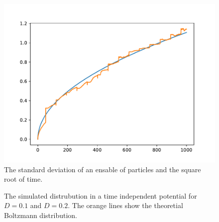 \documentclass[a4paper, 12pt]{article}
\begin{document}
\begin{figure}[ht]
\centering
\includegraphics[width=.75\textwidth]{media/diffusion}
\caption{The standard deviation of an ensable of particles and the square root of time.
\label{fig:diffusion}}
\end{figure}

\begin{figure}
\centering
{}
\caption{The simulated distrubution in a time independent potential for $D=0.1$ and $D=0.2$.
The orange lines show the theoretial Boltzmann distribution.\label{fig:boltzmann}}
\end{figure}
\end{document}
